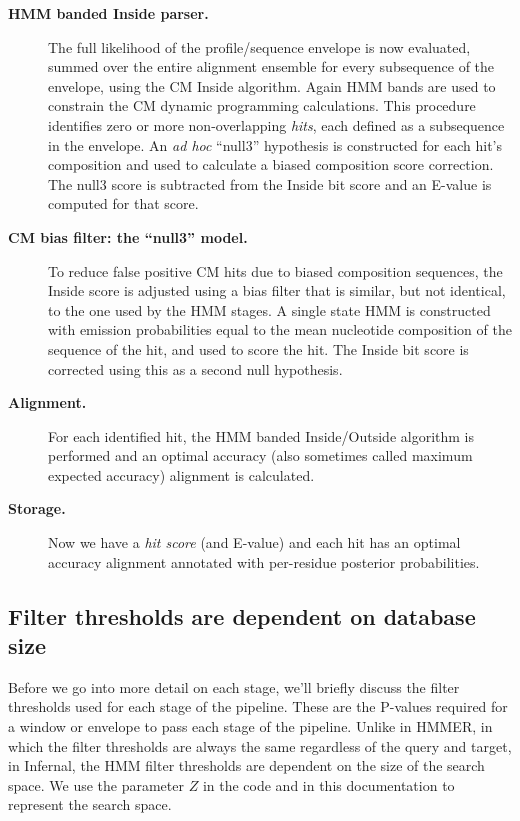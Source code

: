 \begin{description}
\begin{description}
\item[\textbf{HMM banded Inside parser.}] The full likelihood of the
  profile/sequence envelope is now evaluated, summed over the entire
  alignment ensemble for every subsequence of the envelope, using the
  CM Inside algorithm. Again HMM bands are used to constrain the CM
  dynamic programming calculations. This procedure identifies zero or
  more non-overlapping \emph{hits}, each defined as a subsequence in
  the envelope. An \emph{ad hoc} ``null3'' hypothesis is constructed
  for each hit's composition and used to calculate a biased
  composition score correction. The null3 score is subtracted from the
  Inside bit score and an E-value is computed for that score.

\item[\textbf{CM bias filter: the ``null3'' model.}]  To reduce false
  positive CM hits due to biased composition sequences, the Inside
  score is adjusted using a bias filter that is similar, but not
  identical, to the one used by the HMM stages. A single state HMM is
  constructed with emission probabilities equal to the mean nucleotide
  composition of the sequence of the hit, and used to score the hit.
  The Inside bit score is corrected using this as a second null
  hypothesis.

\item[\textbf{Alignment.}] For each identified hit, the HMM banded
  Inside/Outside algorithm is performed and an optimal accuracy (also
  sometimes called maximum expected accuracy) alignment is
  calculated. 

\item[\textbf{Storage.}] Now we have a \emph{hit score} (and E-value)
  and each hit has an optimal accuracy alignment annotated with
  per-residue posterior probabilities.

\end{description}
\end{description}

\subsection{Filter thresholds are dependent on database size}
Before we go into more detail on each stage, we'll briefly discuss the
filter thresholds used for each stage of the pipeline. These are the
P-values required for a window or envelope to pass each stage of the
pipeline. Unlike in HMMER, in which the filter thresholds are always
the same regardless of the query and target, in Infernal, the HMM
filter thresholds are dependent on the size of the search space. We
use the parameter $Z$ in the code and in this documentation to
represent the search space.

